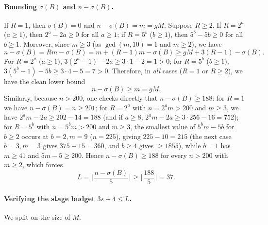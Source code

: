 \documentclass[11pt]{article}
\theoremstyle{remark}
\newcommand{\sig}{\sigma}
\begin{document}
\paragraph{Bounding $\sig(B)$ and $n - \sig(B)$.} If $R = 1$, then $\sig(B) = 0$
and $n - \sig(B) = m = gM$. Suppose $R \ge 2$. If $R = 2^a$ ($a \ge 1$), then
$2^a - 2a \ge 0$ for all $a \ge 1$; if $R = 5^b$ ($b \ge 1$), then
$5^b - 5b \ge 0$ for all $b \ge 1$. Moreover, since $m \ge 3$ (as $\gcd(m,10)=1$
and $m \ge 2$), we have
\[
 n - \sig(B) = R m - \sig(B) = m + (R-1)m - \sig(B) \ge gM + 3(R-1) - \sig(B).
\]
For $R = 2^a$ ($a \ge 1$), $3(2^a - 1) - 2a \ge 3\cdot 1 - 2 = 1 > 0$; for
$R = 5^b$ ($b \ge 1$), $3(5^b - 1) - 5b \ge 3\cdot 4 - 5 = 7 > 0$. Therefore,
in \emph{all} cases ($R = 1$ or $R \ge 2$), we have the clean lower bound
\[
 n - \sig(B) \ge m = gM .
\]
Similarly, because $n > 200$, one checks directly that $n - \sig(B) \ge 188$:
for $R = 1$ we have $n - \sig(B) = n \ge 201$; for $R = 2^a$ with $n = 2^a m > 200$
and $m \ge 3$, we have $2^a m - 2a \ge 202 - 14 = 188$ (and if $a \ge 8$,
$2^a m - 2a \ge 3\cdot 256 - 16 = 752$); for $R = 5^b$ with $n = 5^b m > 200$
and $m \ge 3$, the smallest value of $5^b m - 5b$ for $b \ge 2$ occurs at
$b = 2, m = 9$
($n = 225$), giving $225 - 10 = 215$ (the next case $b = 3, m = 3$ gives
$375 - 15 = 360$, and $b \ge 4$ gives $\ge 1855$), while $b = 1$ has $m \ge 41$
and $5m - 5 \ge 200$. Hence
$n - \sig(B) \ge 188$ for every $n > 200$ with $m \ge 2$, which forces
\[
 L = \Big\lfloor \frac{n - \sig(B)}{5} \Big\rfloor \ge \Big\lfloor \frac{188}{5} \Big\rfloor = 37 .
\]

\paragraph{Verifying the stage budget $3s + 4 \le L$.} We split on the size of $M$.
\end{document}
